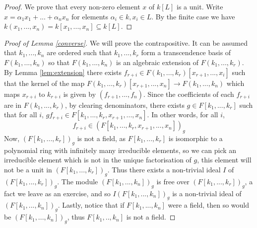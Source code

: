 \documentclass[12pt]{article}
\theoremstyle{plain}
\theoremstyle{definition}
\begin{document}
	\begin{proof}
		We prove that every non-zero element $x$ of $k[L]$ is a unit. Write $x = \alpha_1 x_1 + ... + \alpha_n x_n$ for elements $\alpha_i \in k, x_i \in L$. By the finite case we have $k(x_1,...,x_n) = k[x_1,...,x_n] \subseteq k[L]$.
	\end{proof}
	\begin{proof}[Proof of Lemma \ref{converse}]
		We will prove the contrapositive. It can be assumed that $k_1,...,k_n$ are ordered such that $k_1,...,k_r$ form a transcendence basis of $F(k_1,...,k_n)$ so that $F(k_1,...,k_n)$ is an algebraic extension of $F(k_1,...,k_r)$. By Lemma \ref{lem:extension} there exists $f_{r+i} \in F(k_1,...,k_r)[x_{r+1},...,x_i]$ such that the kernel of the map $F(k_1,...,k_r)[x_{r+1},...,x_n] \to F(k_1,...,k_n)$ which maps $x_{r +i}$ to $k_{r+ i}$ is given by $(f_{r+1},...,f_n)$. Since the coefficients of each $f_{r+i}$ are in $F(k_1,...,k_r)$, by clearing denominators, there exists $g \in F[k_1,...,k_r]$ such that for all $i$, $gf_{r+i} \in F[k_1,...,k_r,x_{r+1},...,x_n]$. In other words, for all $i$, $$f_{r+i} \in (F[k_1,...,k_r,x_{r+1},...,x_n])_g$$
		Now, $(F[k_1,...,k_r])_g$ is not a field, as $F[k_1,...,k_r]$ is isomorphic to a polynomial ring with infinitely many irreducible elements, so we can pick an irreducible element which is not in the unique factorisation of $g$, this element will not be a unit in $(F[k_1,...,k_r])_g$. Thus there exists a non-trivial ideal $I$ of $(F[k_1,...,k_r])_g$. The module $(F[k_1,...,k_n])_g$ is free over $(F[k_1,...,k_r])_g$, a fact we leave as an exercise, and so $I(F[k_1,...,k_n])_g$ is a non-trivial ideal of $(F[k_1,...,k_n])_g$. Lastly, notice that if $F[k_1,...,k_n]$ were a field, then so would be $(F[k_1,...,k_n])_g$, thus $F[k_1,..,k_n]$ is not a field.
	\end{proof}
\end{document}
